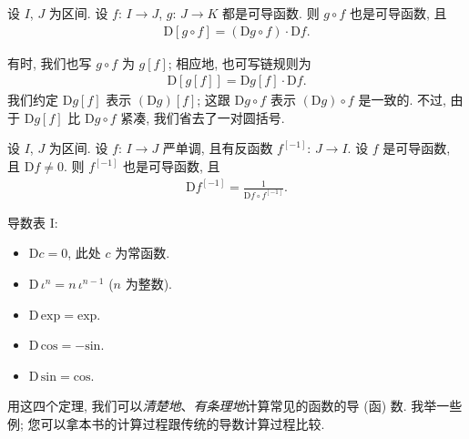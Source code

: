 \begin{theorem}
    设 $I$, $J$ 为区间. 设 $f$: $I \to J$, $g$: $J \to K$ 都是可导函数. 则 $g \circ f$ 也是可导函数, 且
    \begin{align*}
        \mathrm{D} [g \circ f] = (\mathrm{D}g \circ f) \cdot \mathrm{D}f.
    \end{align*}
\end{theorem}

\begin{remark}
    有时, 我们也写 $g \circ f$ 为 $g[f]$; 相应地, 也可写链规则为
    \begin{align*}
        \mathrm{D} [g[f]] = \mathrm{D}g[f] \cdot \mathrm{D}f.
    \end{align*}
    我们约定 $\mathrm{D}g[f]$ 表示 $(\mathrm{D}g)[f]$; 这跟 $\mathrm{D}g \circ f$ 表示 $(\mathrm{D}g) \circ f$ 是一致的. 不过, 由于 $\mathrm{D}g[f]$ 比 $\mathrm{D}g \circ f$ 紧凑, 我们省去了一对圆括号.
\end{remark}

\begin{theorem}
    设 $I$, $J$ 为区间. 设 $f$: $I \to J$ 严单调, 且有反函数 $f^{[-1]}$: $J \to I$. 设 $f$ 是可导函数, 且 $\mathrm{D}f \neq 0$. 则 $f^{[-1]}$ 也是可导函数, 且
    \begin{align*}
        \mathrm{D} f^{[-1]} = \frac{1}{\mathrm{D}f \circ f^{[-1]}}.
    \end{align*}
\end{theorem}

\begin{theorem}
    导数表 I:
    \begin{itemize}
        \item $\mathrm{D} c = 0$, 此处 $c$ 为常函数.
        \item $\mathrm{D}\, \iota^n = n \, \iota^{n - 1}$ ($n$ 为整数).
        \item $\mathrm{D}\, \mathrm{exp} = \mathrm{exp}$.
        \item $\mathrm{D}\, \mathrm{cos} = -\mathrm{sin}$.
        \item $\mathrm{D}\, \mathrm{sin} = \mathrm{cos}$.
    \end{itemize}
\end{theorem}

用这四个定理, 我们可以\emph{清楚地}、\emph{有条理地}计算常见的函数的导 (函) 数. 我举一些例; 您可以拿本书的计算过程跟传统的导数计算过程比较.

